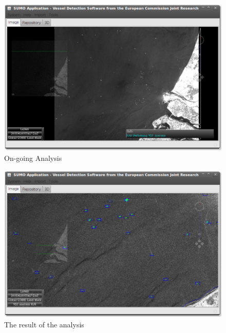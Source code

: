 \documentclass[12pt,a4paper,final]{report}
\begin{document}
\begin{figure}[H]
 \centering
 \includegraphics[scale=0.45,keepaspectratio=true]{./images/VDS3.png}
 \caption{On-going Analysis}
\end{figure}

\begin{figure}[H]
 \centering
 \includegraphics[scale=0.45,keepaspectratio=true]{./images/VDS4.png}
 \caption{The result of the analysis}
\end{figure}
\end{document}
